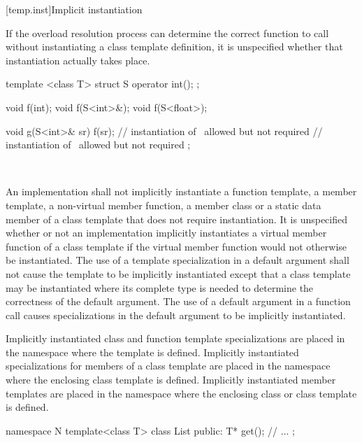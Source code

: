 \documentclass[american]{book}
\begin{document}
\begin{paras}
[temp.inst]{Implicit instantiation}

\setcounter{Paras}{4}
\pnum
If the overload resolution process can determine the correct function to
call without instantiating a class template definition, it is unspecified
whether that instantiation actually takes place.
\enterexample\ 

\begin{codeblock}
template <class T> struct S {
  operator int();
};

void f(int);
void f(S<int>&);
void f(S<float>);

void g(S<int>& sr) {
  f(sr);                  // instantiation of \ allowed but not required
        // instantiation of \ allowed but not required
};
\end{codeblock}
\exitexample\ 

\setcounter{Paras}{8}
\textcolor{black}{\pnum}
An implementation shall not implicitly instantiate a function template,
a member template, a non-virtual member function,
 a member class or a
static data member of a class template that does not require instantiation.
It is unspecified whether or not an implementation implicitly instantiates a
virtual member function of a class template if the virtual member function would
not otherwise be instantiated.
The use of a template specialization in a default argument
shall not cause the template to be implicitly instantiated except that a
class template may be instantiated where its complete type is needed to determine
the correctness of the default argument.
The use of a default argument in a
function call causes specializations in the default argument to be implicitly
instantiated.

\pnum
Implicitly instantiated class and function template specializations are placed
in the namespace where the template is defined.
Implicitly instantiated specializations for members of a class template are
placed in the namespace \textcolor{black}{}where the enclosing class template is defined.
Implicitly instantiated member templates are placed in the namespace where the
enclosing class or class template is defined.
\enterexample\ 

\begin{codeblock}
namespace N {
  template<class T> class List {
  public:
    T* get();
  // ...
  };
}


\end{codeblock}
\end{paras}
\end{document}
